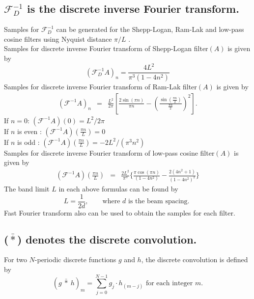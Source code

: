 \subsection{$\mathscr{F}^{-1}_{D} $ is the discrete inverse Fourier transform.}
Samples for $\mathscr{F}^{-1}_{D} $ can be generated for the Shepp-Logan, Ram-Lak and low-pass cosine filters using Nyquist distance $\pi/L$ \cite{charles}.\\
Samples for discrete inverse Fourier transform of Shepp-Logan filter$(A)$ is given by
$$
(\mathscr{F}^{-1}_{D} A)_n =  \frac{4L^2}{\pi^3 (1-4n^2)}
$$
Samples for discrete inverse Fourier transform of Ram-Lak filter$(A)$ is given by
\begin{eqnarray}
\left(\mathscr{F}^{-1}A\right)_n &=& \frac{L^2}{2\pi}\left[ \frac{2\sin(\pi n)}{\pi n}-\left(\frac{\sin(\frac{\pi n}{2})}{\frac{\pi n}{2}}\right)^2 \right].\nonumber
\end{eqnarray}
If $n=0$: $(\mathscr{F}^{-1}A)(0) = L^2/2\pi$ \\
If $n$ is even : $(\mathscr{F}^{-1}A)(\frac{\pi n}{L})=0$ \\
If $n$ is odd : $(\mathscr{F}^{-1}A)(\frac{\pi n}{L})= -2L^2/(\pi^3 n^2)$\\
Samples for discrete inverse Fourier transform of low-pass cosine filter$(A)$ is given by
\begin{eqnarray}
\left(\mathscr{F}^{-1}A\right)\left(\frac{\pi n}{L}\right)&=&
\frac{2L^2}{\pi^3} \Big\lbrace  \frac{\pi \cos(\pi n)}{(1-4n^2)} -  \frac{2(4n^2+1)}{(1-4n^2)^2} \Big\rbrace \nonumber
\end{eqnarray}
The band limit $L$ in each above formulas can be found by 
$$
L = \frac{1}{2d},  \qquad \text{where } d \text{ is the beam spacing. }
$$
Fast Fourier transform also can be used to obtain the samples for each filter. 

\subsection{($\bar{*}$) denotes the discrete convolution.}
For two $N$-periodic discrete functions $g$ and $h$, the discrete convolution is defined by
$$
(g \ \bar{*} \ h)_m = \sum_{j=0}^{N-1} g_j \cdot h_{(m-j)} \text{ for each integer } m.
$$ 
